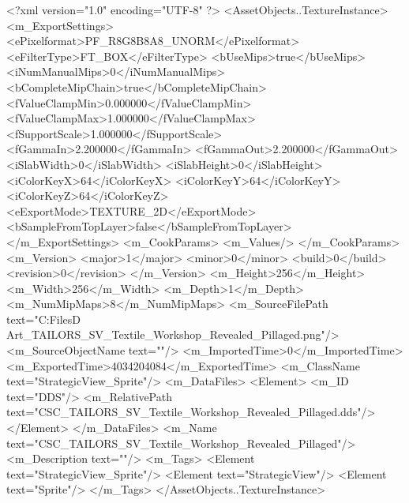 <?xml version="1.0" encoding="UTF-8" ?>
<AssetObjects..TextureInstance>
	<m_ExportSettings>
		<ePixelformat>PF_R8G8B8A8_UNORM</ePixelformat>
		<eFilterType>FT_BOX</eFilterType>
		<bUseMips>true</bUseMips>
		<iNumManualMips>0</iNumManualMips>
		<bCompleteMipChain>true</bCompleteMipChain>
		<fValueClampMin>0.000000</fValueClampMin>
		<fValueClampMax>1.000000</fValueClampMax>
		<fSupportScale>1.000000</fSupportScale>
		<fGammaIn>2.200000</fGammaIn>
		<fGammaOut>2.200000</fGammaOut>
		<iSlabWidth>0</iSlabWidth>
		<iSlabHeight>0</iSlabHeight>
		<iColorKeyX>64</iColorKeyX>
		<iColorKeyY>64</iColorKeyY>
		<iColorKeyZ>64</iColorKeyZ>
		<eExportMode>TEXTURE_2D</eExportMode>
		<bSampleFromTopLayer>false</bSampleFromTopLayer>
	</m_ExportSettings>
	<m_CookParams>
		<m_Values/>
	</m_CookParams>
	<m_Version>
		<major>1</major>
		<minor>0</minor>
		<build>0</build>
		<revision>0</revision>
	</m_Version>
	<m_Height>256</m_Height>
	<m_Width>256</m_Width>
	<m_Depth>1</m_Depth>
	<m_NumMipMaps>8</m_NumMipMaps>
	<m_SourceFilePath text="C:\Users\Shadow\Desktop\Working Files\2D Art\Quarters\Tailors\StrategicView\CSC_TAILORS_SV_Textile_Workshop_Revealed_Pillaged.png"/>
	<m_SourceObjectName text=""/>
	<m_ImportedTime>0</m_ImportedTime>
	<m_ExportedTime>4034204084</m_ExportedTime>
	<m_ClassName text="StrategicView_Sprite"/>
	<m_DataFiles>
		<Element>
			<m_ID text="DDS"/>
			<m_RelativePath text="CSC_TAILORS_SV_Textile_Workshop_Revealed_Pillaged.dds"/>
		</Element>
	</m_DataFiles>
	<m_Name text="CSC_TAILORS_SV_Textile_Workshop_Revealed_Pillaged"/>
	<m_Description text=""/>
	<m_Tags>
		<Element text="StrategicView_Sprite"/>
		<Element text="StrategicView"/>
		<Element text="Sprite"/>
	</m_Tags>
</AssetObjects..TextureInstance>

